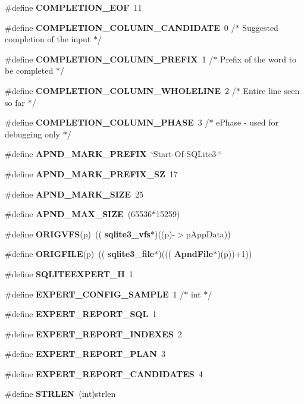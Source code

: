 \begin{DoxyCompactItemize}
\item 
\#define \textbf{ C\+O\+M\+P\+L\+E\+T\+I\+O\+N\+\_\+\+E\+OF}~11
\item 
\#define \textbf{ C\+O\+M\+P\+L\+E\+T\+I\+O\+N\+\_\+\+C\+O\+L\+U\+M\+N\+\_\+\+C\+A\+N\+D\+I\+D\+A\+TE}~0  /$\ast$ Suggested completion of the input $\ast$/
\item 
\#define \textbf{ C\+O\+M\+P\+L\+E\+T\+I\+O\+N\+\_\+\+C\+O\+L\+U\+M\+N\+\_\+\+P\+R\+E\+F\+IX}~1  /$\ast$ Prefix of the word to be completed $\ast$/
\item 
\#define \textbf{ C\+O\+M\+P\+L\+E\+T\+I\+O\+N\+\_\+\+C\+O\+L\+U\+M\+N\+\_\+\+W\+H\+O\+L\+E\+L\+I\+NE}~2  /$\ast$ Entire line seen so far $\ast$/
\item 
\#define \textbf{ C\+O\+M\+P\+L\+E\+T\+I\+O\+N\+\_\+\+C\+O\+L\+U\+M\+N\+\_\+\+P\+H\+A\+SE}~3  /$\ast$ e\+Phase -\/ used for debugging only $\ast$/
\item 
\#define \textbf{ A\+P\+N\+D\+\_\+\+M\+A\+R\+K\+\_\+\+P\+R\+E\+F\+IX}~\char`\"{}Start-\/Of-\/S\+Q\+Lite3-\/\char`\"{}
\item 
\#define \textbf{ A\+P\+N\+D\+\_\+\+M\+A\+R\+K\+\_\+\+P\+R\+E\+F\+I\+X\+\_\+\+SZ}~17
\item 
\#define \textbf{ A\+P\+N\+D\+\_\+\+M\+A\+R\+K\+\_\+\+S\+I\+ZE}~25
\item 
\#define \textbf{ A\+P\+N\+D\+\_\+\+M\+A\+X\+\_\+\+S\+I\+ZE}~(65536$\ast$15259)
\item 
\#define \textbf{ O\+R\+I\+G\+V\+FS}(p)~((\textbf{ sqlite3\+\_\+vfs}$\ast$)((p)-\/$>$p\+App\+Data))
\item 
\#define \textbf{ O\+R\+I\+G\+F\+I\+LE}(p)~((\textbf{ sqlite3\+\_\+file}$\ast$)(((\textbf{ Apnd\+File}$\ast$)(p))+1))
\item 
\#define \textbf{ S\+Q\+L\+I\+T\+E\+E\+X\+P\+E\+R\+T\+\_\+H}~1
\item 
\#define \textbf{ E\+X\+P\+E\+R\+T\+\_\+\+C\+O\+N\+F\+I\+G\+\_\+\+S\+A\+M\+P\+LE}~1    /$\ast$ int $\ast$/
\item 
\#define \textbf{ E\+X\+P\+E\+R\+T\+\_\+\+R\+E\+P\+O\+R\+T\+\_\+\+S\+QL}~1
\item 
\#define \textbf{ E\+X\+P\+E\+R\+T\+\_\+\+R\+E\+P\+O\+R\+T\+\_\+\+I\+N\+D\+E\+X\+ES}~2
\item 
\#define \textbf{ E\+X\+P\+E\+R\+T\+\_\+\+R\+E\+P\+O\+R\+T\+\_\+\+P\+L\+AN}~3
\item 
\#define \textbf{ E\+X\+P\+E\+R\+T\+\_\+\+R\+E\+P\+O\+R\+T\+\_\+\+C\+A\+N\+D\+I\+D\+A\+T\+ES}~4
\item 
\#define \textbf{ S\+T\+R\+L\+EN}~(int)strlen

\end{DoxyCompactItemize}
